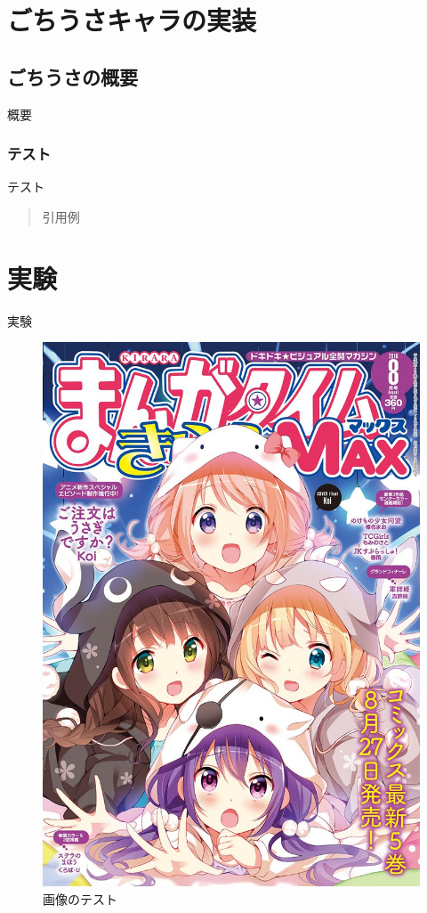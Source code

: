 \documentclass[11pt, a4paper]{jreport} %
\begin{document}
\chapter{ごちうさキャラの実装}

\section{ごちうさの概要}
概要
\subsection{テスト}
テスト\cite{gochiusa}
\begin{quote}
	引用例
\end{quote}

\chapter{実験}
実験

\begin{figure}[H]
	\centering
	\includegraphics[width=0.7\linewidth]{example.jpg}
	\caption{画像のテスト}
	\label{fig:example}
\end{figure}
\end{document}

